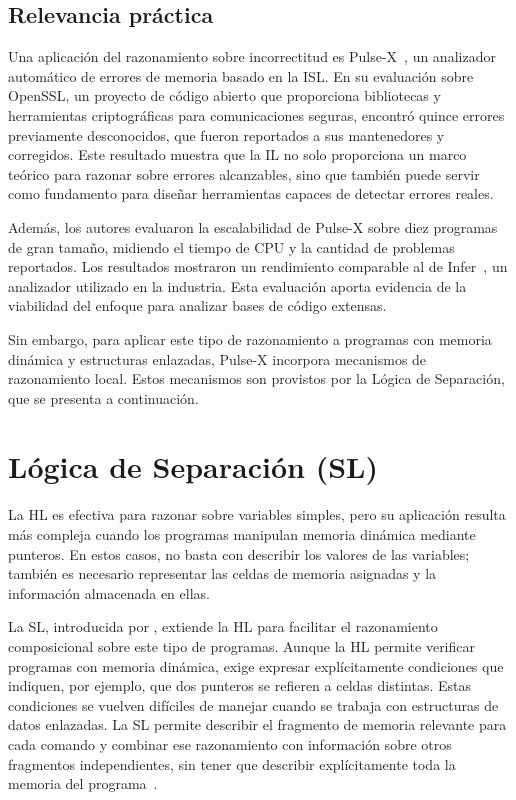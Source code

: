 \documentclass[a4paper,	11pt]{report}
\begin{document}
\subsection*{Relevancia práctica}
Una aplicación del razonamiento sobre incorrectitud es Pulse-X~\citep{bugs},
un analizador automático de errores de memoria basado en la ISL.
En su evaluación sobre OpenSSL,
un proyecto de código abierto que proporciona bibliotecas y herramientas criptográficas para comunicaciones seguras,
encontró quince errores previamente desconocidos, que fueron reportados a sus mantenedores y corregidos.
Este resultado muestra que la IL no solo proporciona un marco teórico para razonar sobre errores alcanzables,
sino que también puede servir como fundamento para diseñar herramientas capaces de detectar errores reales.

Además,
los autores evaluaron la escalabilidad de Pulse-X sobre diez programas de gran tamaño,
midiendo el tiempo de CPU y la cantidad de problemas reportados.
Los resultados mostraron un rendimiento comparable al de Infer~\citep{infer},
un analizador utilizado en la industria.
Esta evaluación aporta evidencia de la viabilidad del enfoque para analizar bases de código extensas.

Sin embargo,
para aplicar este tipo de razonamiento a programas con memoria dinámica y estructuras enlazadas,
Pulse-X incorpora mecanismos de razonamiento local.
Estos mecanismos son provistos por la Lógica de Separación,
que se presenta a continuación.

\section{Lógica de Separación (SL)}
\label{sec:logsep}
La HL es efectiva para razonar sobre variables simples,
pero su aplicación resulta más compleja cuando los programas manipulan memoria dinámica mediante punteros.
En estos casos,
no basta con describir los valores de las variables;
también es necesario representar las celdas de memoria asignadas y la información almacenada en ellas.

La SL, introducida por \citet{sl},
extiende la HL para
facilitar el razonamiento composicional sobre este tipo de programas.
Aunque la HL permite verificar programas con memoria dinámica,
exige expresar explícitamente condiciones que indiquen,
por ejemplo,
que dos punteros se refieren a celdas distintas.
Estas condiciones se vuelven difíciles de manejar cuando se trabaja con estructuras de datos enlazadas.
La SL permite describir
el fragmento de memoria relevante para cada comando
y combinar ese razonamiento con información sobre otros fragmentos independientes,
sin tener que describir explícitamente toda la memoria del programa~\citep{local}.
\end{document}
